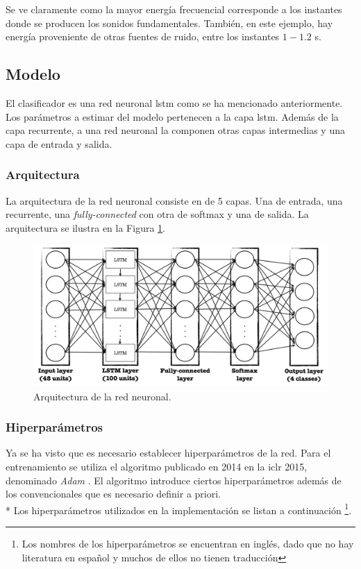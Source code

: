 \indent Se ve claramente como la mayor energía frecuencial corresponde a los instantes donde se producen los sonidos
fundamentales.
También, en este ejemplo, hay energía proveniente de otras fuentes de ruido, entre los instantes $1-1.2$ s.

\subsection{Modelo} \label{subsec:model}

\indent El clasificador es una red neuronal \acrshort{lstm} como se ha mencionado anteriormente. Los parámetros a
estimar del modelo pertenecen a la capa \acrshort{lstm}.
Además de la capa recurrente, a una red neuronal la componen otras capas intermedias y una capa de entrada y salida.

\subsubsection{Arquitectura}

\indent La arquitectura de la red neuronal consiste en de 5 capas. Una de entrada, una recurrente, una
\textit{fully-connected} con otra de softmax y una de salida. La arquitectura se ilustra en la Figura
\ref{fig:nn-architecture}.

\begin{figure}[H]
  \centering
  \includegraphics[scale=0.35]{sections/chapter-07/images/lstm-architecture.png}
  \caption[Arquitectura de la red neuronal]{Arquitectura de la red neuronal.}
  \label{fig:nn-architecture}
\end{figure}

\subsubsection{Hiperparámetros}

\indent Ya se ha visto que es necesario establecer hiperparámetros de la red. Para el entrenamiento se utiliza el
algoritmo publicado en 2014 en la \acrshort{iclr} 2015, denominado \textit{Adam} \cite{pp:adam}. El algoritmo
introduce ciertos hiperparámetros además de los convencionales que es necesario definir a priori. \\*
\indent Los hiperparámetros utilizados en la implementación se listan a continuación \footnote{Los nombres de los
hiperparámetros se encuentran en inglés, dado que no hay literatura en español y muchos de ellos no tienen
traducción}.

